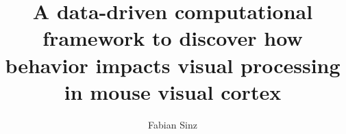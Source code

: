 \usepackage{xifthen}
\newcommand{\ifequals}[3]{\ifthenelse{\equal{#1}{#2}}{#3}{}}
\newcommand{\case}[2]{#1 #2} %
\newenvironment{switch}[1]{\renewcommand{\case}{\ifequals{#1}}}{}

\newcommand{\owptitle}[2]{
    \begin{switch}{#1}
        \case{1}{
            \begin{switch}{#2}
                \case{1}{A video-driven latent state model of the visual system}
                \case{2}{Functional twin with behavior}
            \end{switch}
        }
    \end{switch}
}


\newcommand{\oonetitle}{Develop a video-based, data-driven functional twin of mouse visual cortex and motor behavior in virtual replicas of real environments}
\newcommand{\ooneshort}{Develop a data-driven functional twin}

\newcommand{\otwotitle}{Find correspondences between changes in stimulus selectivity and behavioral context}
\newcommand{\otwoshort}{Changes in stimulus selectivity with behavioral context}

\newcommand{\othreetitle}{Predict how disabling selectivity-changes affects task-driven behavior}
\newcommand{\othreeshort}{Predict how disabling selectivity-changes affects task-driven behavior}



\author{Fabian Sinz}
\title{A data-driven computational framework to discover how behavior impacts visual processing in mouse visual cortex}
